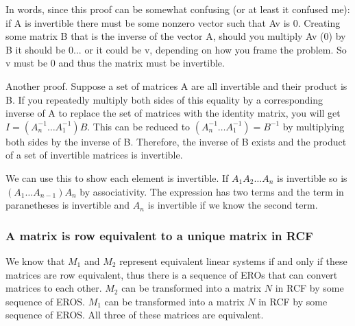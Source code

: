       In words, since this proof can be somewhat confusing (or at least it confused me): if A is invertible there must be some nonzero vector such that Av is 0.
      Creating some matrix B that is the inverse of the vector A, should you multiply Av (0) by B it should be 0... or it could be v, depending on how you frame the problem.
      So v must be 0 and thus the matrix must be invertible.

      Another proof.
      Suppose a set of matrices A are all invertible and their product is B.
      If you repeatedly multiply both sides of this equality by a corresponding inverse of A to replace the set of matrices with the identity matrix, you will get $I = (A_n^{-1} \ldots A_1^{-1})B$.
      This can be reduced to $(A_n^{-1} \ldots A_1^{-1}) = B^{-1}$ by multiplying both sides by the inverse of B.
      Therefore, the inverse of B exists and the product of a set of invertible matrices is invertible.

      We can use this to show each element is invertible.
      If $A_1A_2\ldots A_n$ is invertible so is $(A_1\ldots A_{n-1})A_n$ by associativity.
      The expression has two terms and the term in paranetheses is invertible and $A_n$ is invertible if we know the second term.

    \subsubsection{A matrix is row equivalent to a unique matrix in RCF}

      We know that $M_1$ and $M_2$ represent equivalent linear systems if and only if these matrices are row equivalent, thus there is a sequence of EROs that can convert matrices to each other.
      $M_2$ can be transformed into a matrix $N$ in RCF by some sequence of EROS.
      $M_1$ can be transformed into a matrix $N$ in RCF by some sequence of EROS.
      All three of these matrices are equivalent.